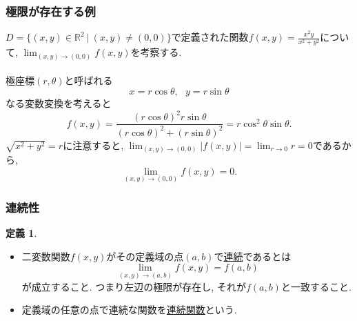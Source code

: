 \documentclass[dvipdfmx,cjk,10.2pt]{beamer}
\newcommand{\R}{\mathbb{R}}
\theoremstyle{definition}
\newtheorem{Def}[Thm]{定義}
\begin{document}


\begin{frame}
\frametitle{極限が存在する例}

$D=\{(x,y) \in \R^2 \ | \ (x,y) \ne (0,0)\}$で定義された関数$f(x,y)=\frac{x^2y}{x^2+y^2}$について, $\displaystyle \lim_{(x,y)\to (0,0)}f(x,y)$を考察する. \\
\ \\

極座標$(r,\theta)$と呼ばれる
$$
x= r \cos \theta, \ \ \ y = r \sin \theta
$$
なる変数変換を考えると
$$
f(x,y)=\frac{(r\cos \theta)^2 r \sin \theta}{(r \cos \theta)^2+(r \sin \theta)^2}=r \cos^2 \theta \sin \theta. 
$$
$\sqrt{x^2+y^2}=r$に注意すると, $\displaystyle \lim_{(x,y)\to (0,0)}|f(x,y)|= \lim_{r \to 0} r=0$であるから, 
$$
\lim_{(x,y)\to (0,0)}f(x,y)=0.
$$
 
\end{frame}




\begin{frame}
\frametitle{連続性}


\begin{Def}
\begin{itemize}
\item 二変数関数$f(x,y)$がその定義域の点$(a,b)$で\underline{連続}であるとは
$$
\lim_{(x,y)\to (a,b)}f(x,y) = f(a,b)
$$
が成立すること. つまり左辺の極限が存在し, それが$f(a,b)$と一致すること. 
\item 定義域の任意の点で連続な関数を\underline{連続関数}という. 
\end{itemize}
\end{Def}

\end{frame}







\end{document}
